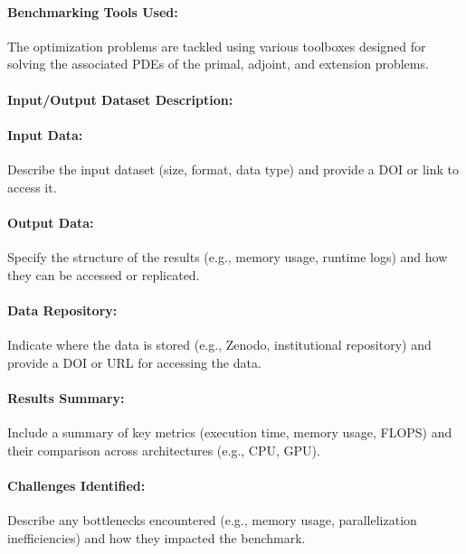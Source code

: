 \paragraph{Benchmarking Tools Used:} The optimization problems are tackled using various \Feelpp toolboxes designed for solving the associated PDEs of the primal, adjoint, and extension problems.

\paragraph{Input/Output Dataset Description:}
\paragraph{Input Data:} Describe the input dataset (size, format, data type) and provide a DOI or link to access it.

\paragraph{Output Data:} Specify the structure of the results (e.g., memory usage, runtime logs) and how they can be accessed or replicated.

\paragraph{Data Repository:} Indicate where the data is stored (e.g., Zenodo, institutional repository) and provide a DOI or URL for accessing the data.

\paragraph{Results Summary:} Include a summary of key metrics (execution time, memory usage, FLOPS) and their comparison across architectures (e.g., CPU, GPU).

\paragraph{Challenges Identified:} Describe any bottlenecks encountered (e.g., memory usage, parallelization inefficiencies) and how they impacted the benchmark.



